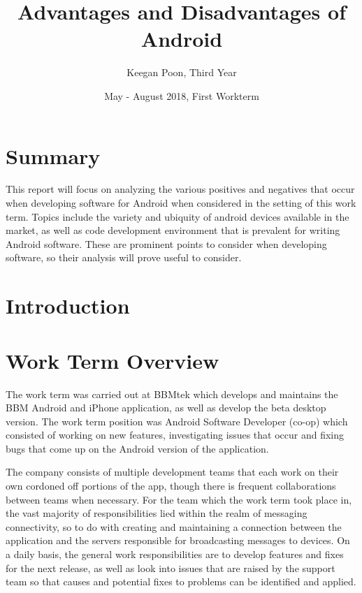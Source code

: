 \documentclass[12pt, letterpaper]{article}
\title{Advantages and Disadvantages of Android}
\author{Keegan Poon, Third Year}
\date{May - August 2018, First Workterm}
\begin{document}
 
\begin{titlepage}
\maketitle
\end{titlepage}
 
\section{Summary}
This report will focus on analyzing the various positives and negatives
that occur when developing software for Android when considered in the
setting of this work term. Topics include the variety and ubiquity of 
android devices available in the market, as well as code development 
environment that is prevalent for writing Android software. These are 
prominent points to consider when developing software, so their analysis
will prove useful to consider.

\newpage

\tableofcontents
\newpage

\section{Introduction}

\section{Work Term Overview}

The work term was carried out at BBMtek which develops and maintains the 
BBM Android and iPhone application, as well as develop the beta desktop 
version. The work term position was Android Software Developer (co-op) 
which consisted of working on new features, investigating issues that occur
and fixing bugs that come up on the Android version of the application.

The company consists of multiple development teams that each work on
their own cordoned off portions of the app, though there is frequent
collaborations between teams when necessary. For the team which the
work term took place in, the vast majority of responsibilities lied
within the realm of messaging connectivity, so to do with creating and
maintaining a connection between the application and the servers responsible
for broadcasting messages to devices. On a daily basis, the general work
responsibilities are to develop features and fixes for the next release, as
well as look into issues that are raised by the support team so that
causes and potential fixes to problems can be identified and applied.
\end{document}
